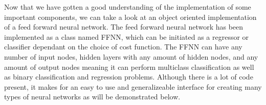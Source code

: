 \documentclass[%
oneside,                 %
final,                   %
10pt]{article}
\begin{document}
Now that we have gotten a good understanding of the implementation of
some important components, we can take a look at an object oriented
implementation of a feed forward neural network. The feed forward
neural network has been implemented as a class named FFNN, which can
be initiated as a regressor or classifier dependant on the choice of
cost function. The FFNN can have any number of input nodes, hidden
layers with any amount of hidden nodes, and any amount of output nodes
meaning it can perform multiclass classification as well as binary
classification and regression problems. Although there is a lot of
code present, it makes for an easy to use and generalizeable interface
for creating many types of neural networks as will be demonstrated
below.
\end{document}
